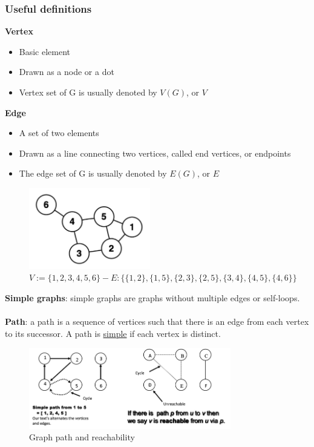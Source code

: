 \documentclass[10pt,a4paper]{article}
\newcommand{\nline}{\\~\\}
\begin{document}
\subsubsection{Useful definitions}
\textbf{Vertex}
\begin{itemize}
	\item Basic element
	\item Drawn as a node or a dot
	\item Vertex set of G is usually denoted by $V(G)$, or $V$
\end{itemize}
\textbf{Edge}
\begin{itemize}
	\item A set of two elements
	\item Drawn as a line connecting two vertices, called end vertices, or endpoints
	\item The edge set of G is usually denoted by $E(G)$, or $E$
\end{itemize} \pagebreak
\begin{figure}[h!]
 \hfill \includegraphics[width=150pt]{images/graph-example.png}\hspace*{\fill}
  \caption{$V:= \{1,2,3,4,5,6\} - E: \{ \{1,2\},\{1,5\},\{2,3\},\{2,5\},\{3,4\},\{4,5\},\{4,6\}\}$}
\end{figure}
\textbf{Simple graphs}: simple graphs are graphs without multiple edges or self-loops.
\nline
\textbf{Path}: a path is a sequence of vertices such that there is an edge from each vertex to its successor. A path is \uline{simple} if each vertex is distinct.
\begin{figure}[h!]
 \hfill \includegraphics[width=250pt]{images/graph-path.png}\hspace*{\fill}
  \caption{Graph path and reachability}
\end{figure} \\
\end{document}
